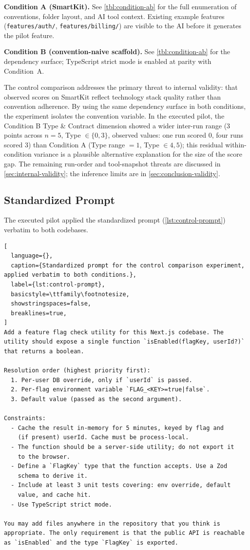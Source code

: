 \documentclass[12pt,a4paper]{report}
\DeclareRobustCommand{\filename}[1]{\bgroup\urlstyle{tt}\nolinkurl{#1}\egroup}
\begin{document}
\medskip\noindent\textbf{Condition A (SmartKit).} See \autoref{tbl:condition-ab} for the full enumeration of conventions, folder layout, and AI tool context. Existing example features (\filename{features/auth/}, \filename{features/billing/}) are visible to the AI before it generates the pilot feature.

\medskip\noindent\textbf{Condition B (convention-naive scaffold).} See \autoref{tbl:condition-ab} for the dependency surface; TypeScript strict mode is enabled at parity with Condition~A.

The control comparison addresses the primary threat to internal validity: that observed scores on SmartKit reflect technology stack quality rather than convention adherence. By using the same dependency surface in both conditions, the experiment isolates the convention variable. In the executed pilot, the Condition B Type \& Contract dimension showed a wider inter-run range ($3$ points across $n=5$, Type $\in \{0, 3\}$, observed values: one run scored 0, four runs scored 3) than Condition A (Type range $= 1$, Type $\in 4, 5$); this residual within-condition variance is a plausible alternative explanation for the size of the score gap. The remaining run-order and tool-snapshot threats are discussed in \autoref{sec:internal-validity}; the inference limits are in \autoref{sec:conclusion-validity}.

\subsection{Standardized Prompt}
\label{sec:standardized-prompt}

The executed pilot applied the standardized prompt (\autoref{lst:control-prompt}) verbatim to both codebases.

\begin{lstlisting}[
  language={},
  caption={Standardized prompt for the control comparison experiment, applied verbatim to both conditions.},
  label={lst:control-prompt},
  basicstyle=\ttfamily\footnotesize,
  showstringspaces=false,
  breaklines=true,
]
Add a feature flag check utility for this Next.js codebase. The
utility should expose a single function `isEnabled(flagKey, userId?)`
that returns a boolean.

Resolution order (highest priority first):
  1. Per-user DB override, only if `userId` is passed.
  2. Per-flag environment variable `FLAG_<KEY>=true|false`.
  3. Default value (passed as the second argument).

Constraints:
  - Cache the result in-memory for 5 minutes, keyed by flag and
    (if present) userId. Cache must be process-local.
  - The function should be a server-side utility; do not export it
    to the browser.
  - Define a `FlagKey` type that the function accepts. Use a Zod
    schema to derive it.
  - Include at least 3 unit tests covering: env override, default
    value, and cache hit.
  - Use TypeScript strict mode.

You may add files anywhere in the repository that you think is
appropriate. The only requirement is that the public API is reachable
as `isEnabled` and the type `FlagKey` is exported.
\end{lstlisting}
\end{document}
